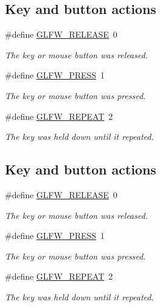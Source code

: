 \subsection*{Key and button actions}
\begin{DoxyCompactItemize}
\item 
\#define \hyperlink{group__input_gada11d965c4da13090ad336e030e4d11f}{G\+L\+F\+W\+\_\+\+R\+E\+L\+E\+A\+SE}~0
\begin{DoxyCompactList}\small\item\em The key or mouse button was released. \end{DoxyCompactList}\item 
\#define \hyperlink{group__input_ga2485743d0b59df3791c45951c4195265}{G\+L\+F\+W\+\_\+\+P\+R\+E\+SS}~1
\begin{DoxyCompactList}\small\item\em The key or mouse button was pressed. \end{DoxyCompactList}\item 
\#define \hyperlink{group__input_gac96fd3b9fc66c6f0eebaf6532595338f}{G\+L\+F\+W\+\_\+\+R\+E\+P\+E\+AT}~2
\begin{DoxyCompactList}\small\item\em The key was held down until it repeated. \end{DoxyCompactList}\end{DoxyCompactItemize}
\subsection*{Key and button actions}
\begin{DoxyCompactItemize}
\item 
\#define \hyperlink{group__input_gada11d965c4da13090ad336e030e4d11f}{G\+L\+F\+W\+\_\+\+R\+E\+L\+E\+A\+SE}~0
\begin{DoxyCompactList}\small\item\em The key or mouse button was released. \end{DoxyCompactList}\item 
\#define \hyperlink{group__input_ga2485743d0b59df3791c45951c4195265}{G\+L\+F\+W\+\_\+\+P\+R\+E\+SS}~1
\begin{DoxyCompactList}\small\item\em The key or mouse button was pressed. \end{DoxyCompactList}\item 
\#define \hyperlink{group__input_gac96fd3b9fc66c6f0eebaf6532595338f}{G\+L\+F\+W\+\_\+\+R\+E\+P\+E\+AT}~2
\begin{DoxyCompactList}\small\item\em The key was held down until it repeated. \end{DoxyCompactList}\end{DoxyCompactItemize}


